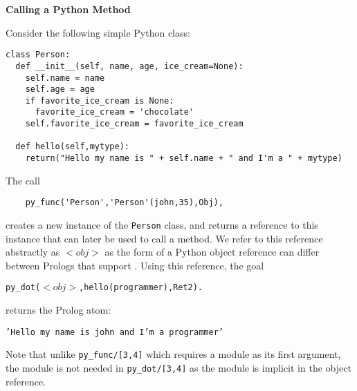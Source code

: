 \begin{example} \rm {\bf Calling a Python Method} \label{jns-examp:method}

\noindent
Consider the following simple Python class:

\begin{verbatim}
class Person:
  def __init__(self, name, age, ice_cream=None):
    self.name = name
    self.age = age
    if favorite_ice_cream is None:
      favorite_ice_cream = 'chocolate'
    self.favorite_ice_cream = favorite_ice_cream

  def hello(self,mytype):
    return("Hello my name is " + self.name + " and I'm a " + mytype)
\end{verbatim}

\noindent
The call

\begin{verbatim}
    py_func('Person','Person'(john,35),Obj),
\end{verbatim}
\noindent
creates a new instance of the {\tt Person} class, and returns a
reference to this instance that can later be used to call a method.
We refer to this reference abstractly as $<obj>$ as the form of a
Python object reference can differ between Prologs that support \janus .
Using this reference, the goal

  {\tt  py\_dot($<obj>$,hello(programmer),Ret2).}

\noindent
returns the Prolog atom:

{\tt 'Hello my name is john and I'm a programmer'}

Note that unlike {\tt py\_func/[3,4]} which requires a module as its
first argument, the module is not needed in {\tt py\_dot/[3,4]} as the
module is implicit in the object reference.
\end{example}

